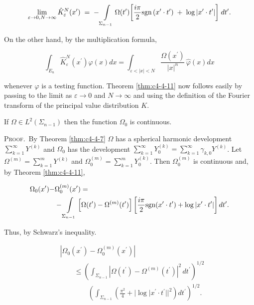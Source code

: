 \[
\lim_{\varepsilon\to0,N\to\infty}\hat{K}_{\varepsilon}^{N}(x^{\prime})\;=\;-\intop_{\Sigma_{n-1}}\Omega(t^{\prime})\biggl[\frac{i\pi}{2}\text{sgn}\left(x^{\prime}\cdot t^{\prime}\right)\;+\;\log\left|x^{\prime}\cdot t^{\prime}\right|\biggr]\;{d}t^{\prime}.
\]

On the other hand, by the multiplication formula,

\[
\int_{E_{n}}\hat{K}_{\varepsilon}^{N}(x^{\prime})\varphi(x)d x=\int_{\varepsilon<|x|<N}\frac{\Omega(x^{\prime})}{|x|^{n}}\,\hat{\varphi}(x)d x
\]

whenever $\varphi$ is a testing function. Theorem \ref{thm:c4-4-11} now follows easily by passing to the limit as $\varepsilon \to 0$ and $N \to \infty$ and using the definition of the Fourier transform of the principal value distribution $K$.

\begin{corollary}
\label{cor:c4-4-12}
If $\Omega \in L^2(\Sigma_{n-1})$ then the function $\Omega_0$ is continuous.
\end{corollary}

\textsc{Proof.}\ By Theorem \ref{thm:c4-4-7} $\Omega$ has a spherical harmonic development $\sum_{k=1}^{\infty} Y^{(k)}$ and $\Omega_0$ has the development $\sum_{k=1}^{\infty} Y_0^{(k)} = \sum_{k=1}^{\infty} \gamma_{k,0} Y^{(k)}$. Let $\Omega^{(m)} = \sum_{k=1}^{m} Y^{(k)}$ and $\Omega_0^{(m)} = \sum_{k=1}^{m} Y_0^{(k)}$. Then $\Omega_0^{(m)}$ is continuous and, by Theorem \ref{thm:c4-4-11},

\[
\begin{aligned}{\Omega_{0}(x^{\prime})-}&{{}\Omega_{0}^{(m)}(x^{\prime})=}\\ {}&{{}-\intop_{\Sigma_{n-1}}\left[\Omega(t^{\prime})-\Omega^{(m)}(t^{\prime})\right]\left[\frac{i\pi}{2}\text{sgn}{(x^{\prime}\cdot t^{\prime})}+\log{|x^{\prime}\cdot t^{\prime}|}\right]{d}t^{\prime}.}\\ \end{aligned}
\]

Thus, by Schwarz's inequality.

\[
\begin{aligned}&|\Omega_{0}(x^{\prime})-\Omega_{0}^{(m)}(x^{\prime})|\\
&\qquad\leq\left(\int_{\Sigma_{n-1}}|\Omega(t^{\prime})-\Omega^{(m)}(t^{\prime})|^{2}\,dt^{\prime}\right)^{1/2}\\
&\qquad\qquad\left(\int_{\Sigma_{n-1}}\left(\frac{\pi^{2}}{4}+|\log|x^{\prime}\cdot t^{\prime}||^{2}\right)dt^{\prime}\right)^{1/2}.\end{aligned}
\]

